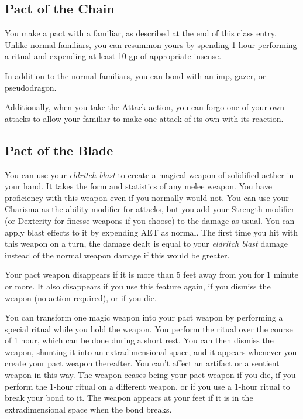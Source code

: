 \subsection{Pact of the Chain}

You make a pact with a familiar, as described at the end of this class entry. Unlike normal familiars, you can resummon yours by spending 1 hour performing a ritual and expending at least 10 gp of appropriate insense.

In addition to the normal familiars, you can bond with an imp, gazer, or pseudodragon.

Additionally, when you take the Attack action, you can forgo one of your own attacks to allow your familiar to make one attack of its own with its reaction.

\subsection{Pact of the Blade}

You can use your \textit{eldritch blast} to create a magical weapon of solidified aether in your hand. It takes the form and statistics of any melee weapon. You have proficiency with this weapon even if you normally would not. You can use your Charisma as the ability modifier for attacks, but you add your Strength modifier (or Dexterity for finesse weapons if you choose) to the damage as usual. You can apply blast effects to it by expending AET as normal. The first time you hit with this weapon on a turn, the damage dealt is equal to your \textit{eldritch blast} damage instead of the normal weapon damage if this would be greater.

Your pact weapon disappears if it is more than 5 feet away from you for 1 minute or more. It also disappears if you use this feature again, if you dismiss the weapon (no action required), or if you die.

You can transform one magic weapon into your pact weapon by performing a special ritual while you hold the weapon. You perform the ritual over the course of 1 hour, which can be done during a short rest. You can then dismiss the weapon, shunting it into an extradimensional space, and it appears whenever you create your pact weapon thereafter. You can't affect an artifact or a sentient weapon in this way. The weapon ceases being your pact weapon if you die, if you perform the 1-hour ritual on a different weapon, or if you use a 1-hour ritual to break your bond to it. The weapon appears at your feet if it is in the extradimensional space when the bond breaks.

